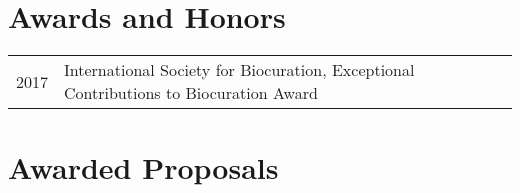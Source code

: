 \documentclass[11pt,fullpage]{article}
\begin{document}




\section*{Awards and Honors}

\begin{longtable}{p{0.5in}|p{5.5in}}

 2017 & International Society for Biocuration, Exceptional Contributions to Biocuration Award  \\

\end{longtable}


\section*{Awarded Proposals}
\end{document}

